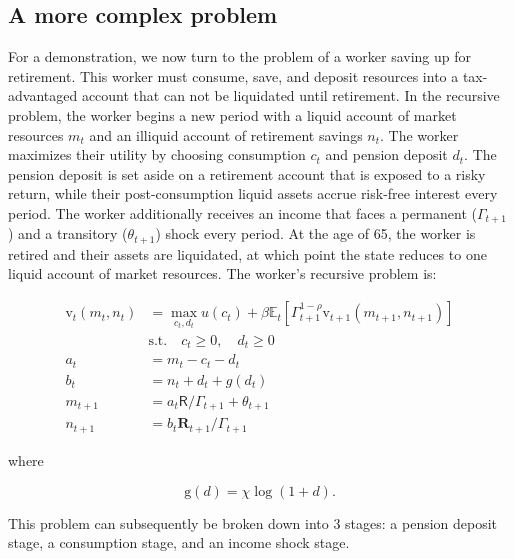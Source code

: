 \documentclass{article}
\newcommand{\DiscFac}{\beta}
\newcommand{\util}{u}
\newcommand{\tShkEmp}{\theta}
\newcommand{\Ex}{\mathbb{E}}
\newcommand{\CRRA}{\rho}
\newcommand{\bRat}{b}
\newcommand{\cRat}{c}
\newcommand{\vFunc}{\mathrm{v}}
\newcommand{\Rfree}{\mathsf{R}}
\newcommand{\PGro}{\Gamma}
\newcommand{\aRat}{a}
\newcommand{\mRat}{m}
\newcommand{\Risky}{\mathbf{R}}
\newcommand{\nRat}{n}
\newcommand{\dRat}{d}
\newcommand{\gFunc}{\mathrm{g}}
\newcommand{\xFer}{\chi}
\begin{document}
\subsection{A more complex problem}\label{A more complex problem}

For a demonstration, we now turn to the problem of a worker saving up for retirement. This worker must consume, save, and deposit resources into a tax-advantaged account that can not be liquidated until retirement. In the recursive problem, the worker begins a new period with a liquid account of market resources $\mRat_{t}$ and an illiquid account of retirement savings $\nRat_{t}$. The worker maximizes their utility by choosing consumption $\cRat_{t}$ and pension deposit $\dRat_{t}$. The pension deposit is set aside on a retirement account that is exposed to a risky return, while their post-consumption liquid assets accrue risk-free interest every period. The worker additionally receives an income that faces a permanent ($\PGro_{t+1}$) and a transitory ($\tShkEmp_{t+1}$) shock every period. At the age of 65, the worker is retired and their assets are liquidated, at which point the state reduces to one liquid account of market resources. The worker's recursive problem is:

\begin{equation}
\begin{split}
    \vFunc_{t}(\mRat_{t}, \nRat_{t}) & = \max_{\cRat_{t}, \dRat_{t}} \util(\cRat_{t}) + \DiscFac \Ex_{t} \left[ \PGro_{t+1}^{1-\CRRA} \vFunc_{t+1}(\mRat_{t+1}, \nRat_{t+1}) \right] \\
    & \text{s.t.} \quad \cRat_{t} \ge 0, \quad \dRat_{t} \ge 0 \\
    \aRat_{t} & = \mRat_{t} - \cRat_{t} - \dRat_{t} \\
    \bRat_{t} & = \nRat_{t} + \dRat_{t} + g(\dRat_{t}) \\
    \mRat_{t+1} & = \aRat_{t} \Rfree / \PGro_{t+1}  + \tShkEmp_{t+1} \\
    \nRat_{t+1} & = \bRat_{t} \Risky_{t+1}  / \PGro_{t+1}
  \end{split}
\end{equation}

where

\begin{equation}
\gFunc(\dRat) = \xFer \log(1+\dRat).
\end{equation}

This problem can subsequently be broken down into 3 stages: a pension deposit stage, a consumption stage, and an income shock stage.
\end{document}
